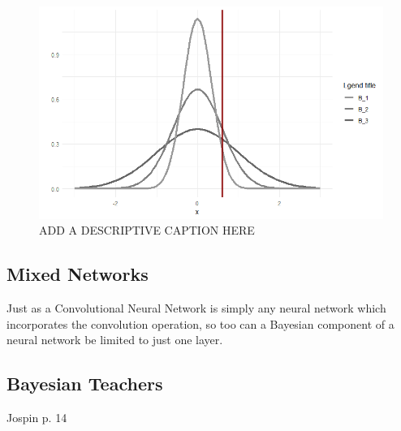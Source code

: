 \begin{figure}[H]
    \centering
    \includegraphics[width = .6\textwidth]{Figures/BNN_modelcheck.png}
    \caption{\footnotesize{ADD A DESCRIPTIVE CAPTION HERE}}
    \label{BNNmodelcheck}
\end{figure}

\subsection{Mixed Networks}
Just as a Convolutional Neural Network is simply any neural network which incorporates the convolution operation, so too can a Bayesian component of a neural network be limited to just one layer.

\subsection{Bayesian Teachers}
Jospin p. 14

